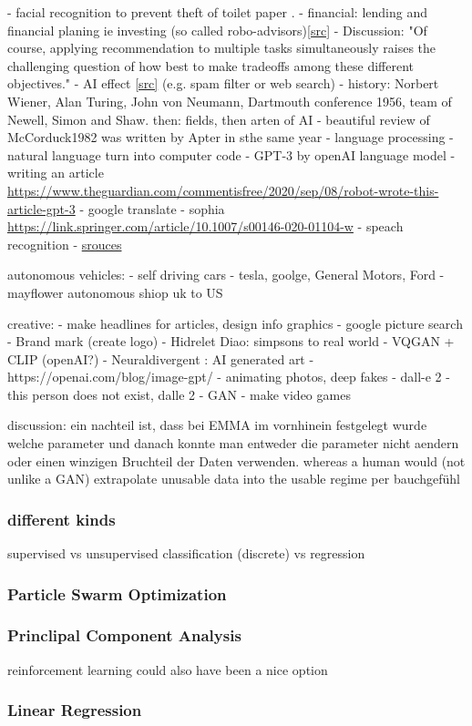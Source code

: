  - facial recognition to prevent theft of toilet paper \cite{Andrews2017}.
 - financial: lending and financial planing ie investing (so called robo-advisors)\cite{Littman2021}\href{https://ai100.stanford.edu/2021-report/standing-questions-and-responses/sq2-what-are-most-important-advances-ai}{[src]}
 - Discussion: "Of course, applying recommendation to multiple tasks simultaneously raises the challenging question of how best to make tradeoffs among these different objectives."\cite{Littman2021}
 - AI effect \href{https://ai100.stanford.edu/2016-report/section-i-what-artificial-intelligence/defining-ai#\_ftnref3}{[src]} \cite{McCorduck1982} (e.g. spam filter or web search) 
 - history: Norbert Wiener, Alan Turing, John von Neumann, Dartmouth conference 1956, team of Newell, Simon and Shaw. then: fields, then arten of AI 
 - beautiful review of McCorduck1982\cite{McCorduck1982} was written by Apter in sthe same year\cite{Apter1982}
 - language processing
 - natural language turn into computer code 
 - GPT-3 by openAI language model 
 - writing an article \url{https://www.theguardian.com/commentisfree/2020/sep/08/robot-wrote-this-article-gpt-3}
 - google translate 
 - sophia \url{https://link.springer.com/article/10.1007/s00146-020-01104-w}
 - speach recognition
 - \href{https://ai100.stanford.edu/2021-report/standing-questions-and-responses/sq2-what-are-most-important-advances-ai#_2021SQ2ref3}{srouces}


autonomous vehicles:
 - self driving cars
 - tesla, goolge, General Motors, Ford
 - mayflower autonomous shiop uk to US

 creative: 
 - make headlines for articles, design info graphics
 - google picture search
 - Brand mark (create logo)
 - Hidrelet Diao: simpsons to real world 
 - VQGAN + CLIP (openAI?)
 - Neuraldivergent : AI generated art
 - https://openai.com/blog/image-gpt/
 - animating photos, deep fakes
 - dall-e 2 \cite{Marcus2022}
 - this person does not exist, dalle 2 
 - GAN
 - make video games \cite{Guzdial2016}

 discussion: ein nachteil ist, dass bei EMMA im vornhinein festgelegt wurde welche parameter und danach konnte man entweder die parameter nicht aendern oder einen winzigen Bruchteil der Daten verwenden. whereas a human would (not unlike a GAN) extrapolate unusable data into the usable regime per bauchgefühl


\subsubsection{different kinds} 
supervised vs unsupervised
classification (discrete) vs regression
%
\subsubsection{Particle Swarm Optimization}
%
\subsubsection{Princlipal Component Analysis}
reinforcement learning could also have been a nice option
%
\subsubsection{Linear Regression}
%
